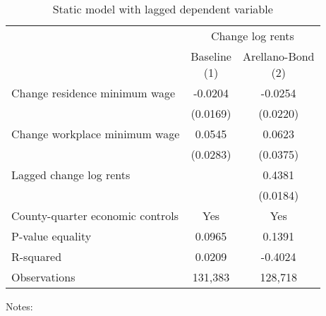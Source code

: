 \begin{table}
    \caption{Static model with lagged dependent variable}
    \label{tab:static_ab}

    \begin{tabular}{@{}lcc@{}}
        \toprule
                               & \multicolumn{2}{c}{Change log rents}                       \\ \cmidrule(l){2-3}
                               & \shortsack{Baseline\\(1)} & \shortsack{Arellano-Bond\\(2)} \\ \midrule
        Change residence minimum wage     &  -0.0204           &  -0.0254                           \\
                                          & (0.0169)          & (0.0220)                          \\
        Change workplace minimum wage     &  0.0545           & 0.0623                            \\
                                          & (0.0283)          & (0.0375)                          \\
        Lagged change log rents           &                & 0.4381                            \\
                                          &                & (0.0184)                          \\ \midrule
        County-quarter economic controls  & Yes            & Yes                            \\
        P-value equality                  & 0.0965            & 0.1391                            \\
        R-squared                         & 0.0209            & -0.4024                            \\
        Observations                      & 131,383           & 128,718                           \\ \bottomrule
    \end{tabular}

    \begin{minipage}{.95\textwidth} \footnotesize
        \vspace{2mm}
        Notes: 
    \end{minipage}
\end{table}
